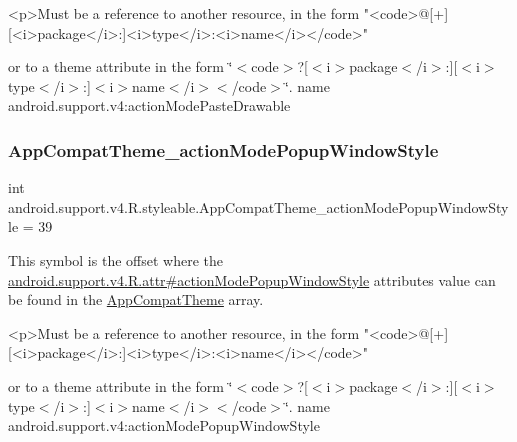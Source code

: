 \begin{DoxyVerb}      <p>Must be a reference to another resource, in the form "<code>@[+][<i>package</i>:]<i>type</i>:<i>name</i></code>"
\end{DoxyVerb}
 or to a theme attribute in the form \char`\"{}$<$code$>$?\mbox{[}$<$i$>$package$<$/i$>$\+:\mbox{]}\mbox{[}$<$i$>$type$<$/i$>$\+:\mbox{]}$<$i$>$name$<$/i$>$$<$/code$>$\char`\"{}.  name android.\+support.\+v4\+:action\+Mode\+Paste\+Drawable \mbox{\label{classandroid_1_1support_1_1v4_1_1R_1_1styleable_ae15d1354af03ae1760e80c0083aed3b1}} 
\subsubsection{\texorpdfstring{App\+Compat\+Theme\+\_\+action\+Mode\+Popup\+Window\+Style}{AppCompatTheme\_actionModePopupWindowStyle}}
{\footnotesize\ttfamily int android.\+support.\+v4.\+R.\+styleable.\+App\+Compat\+Theme\+\_\+action\+Mode\+Popup\+Window\+Style = 39\hspace{0.3cm}{\ttfamily [static]}}

This symbol is the offset where the \hyperlink{classandroid_1_1support_1_1v4_1_1R_1_1attr_a2d18ec285a2e3e5cd9722429901f2d83}{android.\+support.\+v4.\+R.\+attr\#action\+Mode\+Popup\+Window\+Style} attribute\textquotesingle{}s value can be found in the \hyperlink{classandroid_1_1support_1_1v4_1_1R_1_1styleable_ac07ebbe62ed977f6dcaadc6397840ace}{App\+Compat\+Theme} array.

\begin{DoxyVerb}      <p>Must be a reference to another resource, in the form "<code>@[+][<i>package</i>:]<i>type</i>:<i>name</i></code>"
\end{DoxyVerb}
 or to a theme attribute in the form \char`\"{}$<$code$>$?\mbox{[}$<$i$>$package$<$/i$>$\+:\mbox{]}\mbox{[}$<$i$>$type$<$/i$>$\+:\mbox{]}$<$i$>$name$<$/i$>$$<$/code$>$\char`\"{}.  name android.\+support.\+v4\+:action\+Mode\+Popup\+Window\+Style \mbox{\label{classandroid_1_1support_1_1v4_1_1R_1_1styleable_a74c31f8d65fcd2a018041d8588ae4fbc}} 
